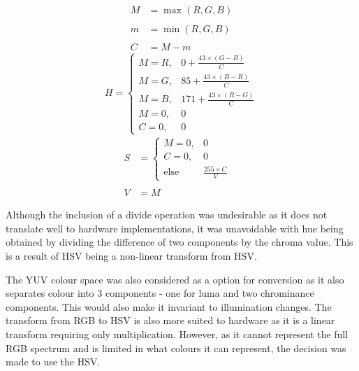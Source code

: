 \documentclass[a4paper]{article}
\begin{document}
\begin{multicols}{3}
    \noindent
    \begin{align*}
        M &= \max(R, G, B) \\ \\
        m &= \min(R, G, B) \\ \\
        C &= M-m 
    \end{align*}
    \begin{equation*}
        H = \begin{cases}
            M = R, & 0 + \frac{43 \times (G-B)}{C} \\
            M = G, & 85 + \frac{43 \times (B-R)}{C} \\
            M = B, & 171 + \frac{43 \times (R-G)}{C} \\
            M = 0, & 0 \\
            C = 0, & 0
        \end{cases} 
    \end{equation*}
    \begin{align*}
        S &= \begin{cases}
            M = 0, & 0 \\ C = 0, & 0 \\ \text{else} & \frac{255\times C}{V}
        \end{cases} & \\ \\
         V &= M  
    \end{align*}
\end{multicols}



Although the inclusion of a divide operation was undesirable as it does not 
translate well to hardware implementations, it was unavoidable with hue being 
obtained by dividing the difference of two components by the chroma value. This 
is a result of HSV being a non-linear transform from HSV. 

The YUV colour space was also considered as a option for conversion as it also
separates colour into 3 components - one for luma and two chrominance components.
This would also make it invariant to illumination changes. The transform from RGB
to HSV is also more suited to hardware as it is a linear transform requiring only
multiplication. However, as it cannot represent the full RGB spectrum and is 
limited in what colours it can represent, the decision was made to use the HSV. 
\end{document}
